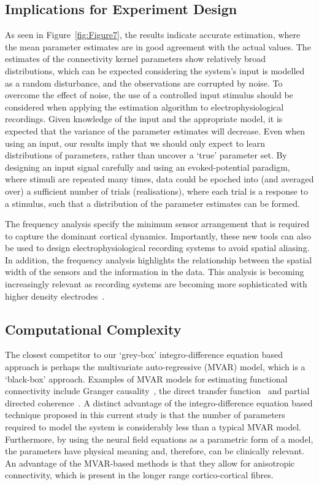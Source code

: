 \documentclass[12pt]{iopart}
\begin{document}
\subsection{Implications for Experiment Design}
As seen in Figure~\ref{fig:Figure7}, the results indicate accurate estimation, where the mean parameter estimates are in good agreement with the actual values. The estimates of the connectivity kernel parameters show relatively broad distributions, which can be expected considering the system's input is modelled as a random disturbance, and the observations are corrupted by noise. To overcome the effect of noise, the use of a controlled input stimulus should be considered when applying the estimation algorithm to electrophysiological recordings. Given knowledge of the input and the appropriate model, it is expected that the variance of the parameter estimates will decrease. Even when using an input, our results imply that we should only expect to learn distributions of parameters, rather than uncover a `true' parameter set. By designing an input signal carefully and using an evoked-potential paradigm, where stimuli are repeated many times, data could be epoched into (and averaged over) a sufficient number of trials (realisations), where each trial is a response to a stimulus, such that a distribution of the parameter estimates can be formed.

The frequency analysis specify the minimum sensor arrangement that is required to capture the dominant cortical dynamics. Importantly, these new tools can also be used to design electrophysiological recording systems to avoid spatial aliasing. In addition, the frequency analysis highlights the relationship between the spatial width of the sensors and the information in the data. This analysis is becoming increasingly relevant as recording systems are becoming more sophisticated with higher density electrodes~\cite{Brinkmann2009}.

\subsection{Computational Complexity}
The closest competitor to our `grey-box' integro-difference equation based approach is perhaps the multivariate auto-regressive (MVAR) model, which is a `black-box' approach. Examples of MVAR models for estimating functional connectivity include Granger causality~\cite{Hesse2003}, the direct transfer function~\cite{Kaminski1991} and partial directed coherence~\cite{Sameshima1999}. A distinct advantage of the integro-difference equation based technique proposed in this current study is that the number of parameters required to model the system is considerably less than a typical MVAR model. Furthermore, by using the neural field equations as a parametric form of a model, the parameters have physical meaning and, therefore, can be clinically relevant. An advantage of the MVAR-based methods is that they allow for anisotropic connectivity, which is present in the longer range cortico-cortical fibres. 
\end{document}
